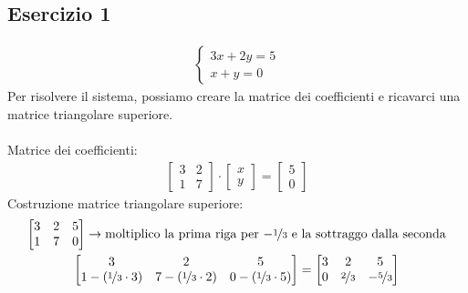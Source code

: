 \documentclass[italian]{article}
\begin{document}
\pagebreak
\subsection{Esercizio 1}
\begin{gather*}
	\begin{cases*}
		3x+2y=5\\
		x+
		y=0
	\end{cases*}
\end{gather*}
Per risolvere il sistema, possiamo creare la matrice dei coefficienti e ricavarci una matrice triangolare superiore.\\\\
Matrice dei coefficienti:
\begin{gather*}
	\begin{bmatrix}
		3 & 2 \\
		1 & 7
	\end{bmatrix}
	\cdot
	\begin{bmatrix}
		x \\ y
	\end{bmatrix}
	=
	\begin{bmatrix}
		5 \\ 0
	\end{bmatrix}
\end{gather*}
Costruzione matrice triangolare superiore:
\begin{gather*}
	\begin{bmatrix}
		3 & 2 & 5 \\
		1 & 7 & 0
	\end{bmatrix}
	\to \text{moltiplico la prima riga per $-\nicefrac{1}{3}$ e la sottraggo dalla seconda}\\
	\begin{bmatrix}
		3 & 2 & 5 \\
		1 -(\nicefrac{1}{3} \cdot 3) & 7 -(\nicefrac{1}{3} \cdot 2) & 0 -(\nicefrac{1}{3} \cdot 5)
	\end{bmatrix}
	=
	\begin{bmatrix}
		3 & 2 & 5 \\
		0 & \nicefrac{2}{3} & -\nicefrac{5}{3}
	\end{bmatrix}
\end{gather*}
\end{document}
